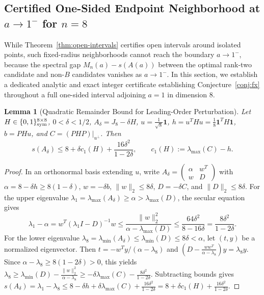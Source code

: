 \documentclass[11pt,reqno]{article}
\newtheorem{lemma}[theorem]{Lemma}
\theoremstyle{definition}
\newcommand{\one}{\mathbf{1}}
\begin{document}
\subsection{Certified One-Sided Endpoint Neighborhood at \texorpdfstring{$a \to 1^-$}{a -> 1-} for \texorpdfstring{$n=8$}{n=8}}

While Theorem~\ref{thm:open-intervals} certifies open intervals around isolated points, such fixed-radius neighborhoods cannot reach the boundary $a \to 1^-$, because the spectral gap $M_n(a) - s(A(a))$ between the optimal rank-two candidate and non-$B$ candidates vanishes as $a \to 1^-$. In this section, we establish a dedicated analytic and exact integer certificate establishing Conjecture~\ref{conj:fx} throughout a full one-sided interval adjoining $a = 1$ in dimension $8$.

\begin{lemma}[Quadratic Remainder Bound for Leading-Order Perturbation]\label{lem:rem}
Let $H \in \{0, 1\}^{8 \times 8}_{\rm sym}$, $0 < \delta < 1/2$, $A_\delta = J_8 - \delta H$, $u = \frac{1}{\sqrt{8}}\one$, $h = u^T H u = \frac{1}{8}\one^T H \one$, $b = P H u$, and $C = (P H P)|_{u^\perp}$. Then
\begin{equation}\label{eq:rem-bound}
s(A_\delta) \le 8 + \delta c_1(H) + \frac{16\delta^2}{1 - 2\delta}, \qquad c_1(H) := \lambda_{\max}(C) - h.
\end{equation}
\end{lemma}
\begin{proof}
In an orthonormal basis extending $u$, write $A_\delta = \begin{pmatrix} \alpha & w^T \\ w & D \end{pmatrix}$ with $\alpha = 8 - \delta h \ge 8(1 - \delta)$, $w = -\delta b$, $\|w\|_2 \le 8\delta$, $D = -\delta C$, and $\|D\|_2 \le 8\delta$.
For the upper eigenvalue $\lambda_1 = \lambda_{\max}(A_\delta) \ge \alpha > \lambda_{\max}(D)$, the secular equation gives
\[
\lambda_1 - \alpha = w^T (\lambda_1 I - D)^{-1} w \le \frac{\|w\|_2^2}{\alpha - \lambda_{\max}(D)} \le \frac{64\delta^2}{8 - 16\delta} = \frac{8\delta^2}{1 - 2\delta}.
\]
For the lower eigenvalue $\lambda_8 = \lambda_{\min}(A_\delta) \le \lambda_{\min}(D) \le 8\delta < \alpha$, let $(t, y)$ be a normalized eigenvector. Then $t = -w^T y / (\alpha - \lambda_8)$ and $(D - \frac{w w^T}{\alpha - \lambda_8}) y = \lambda_8 y$. Since $\alpha - \lambda_8 \ge 8(1 - 2\delta) > 0$, this yields $\lambda_8 \ge \lambda_{\min}(D) - \frac{\|w\|_2^2}{\alpha - \lambda_8} \ge -\delta \lambda_{\max}(C) - \frac{8\delta^2}{1 - 2\delta}$.
Subtracting bounds gives $s(A_\delta) = \lambda_1 - \lambda_8 \le 8 - \delta h + \delta \lambda_{\max}(C) + \frac{16\delta^2}{1 - 2\delta} = 8 + \delta c_1(H) + \frac{16\delta^2}{1 - 2\delta}$.
\end{proof}
\end{document}
